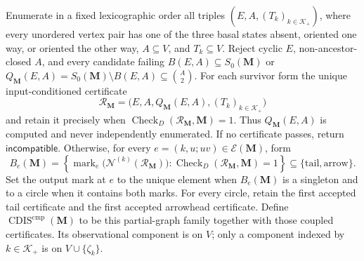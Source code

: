 Enumerate in a fixed lexicographic order all triples \((E,A,(T_k)_{k\in\mathcal K_+})\), where every unordered vertex pair has one of the three basal states absent, oriented one way, or oriented the other way, \(A\subseteq V\), and \(T_k\subseteq V\).  Reject cyclic \(E\), non-ancestor-closed \(A\), and every candidate failing \(B(E,A)\subseteq S_0(\mathbf M)\) or \(Q_{\mathbf M}(E,A)=S_0(\mathbf M)\setminus B(E,A)\subseteq\binom A2\).  For each survivor form the unique input-conditioned certificate
\[
\mathcal R_{\mathbf M}=\bigl(E,A,Q_{\mathbf M}(E,A),(T_k)_{k\in\mathcal K_+}\bigr)
\]
and retain it precisely when \(\operatorname{Check}_{D}(\mathcal R_{\mathbf M},\mathbf M)=1\).  Thus \(Q_{\mathbf M}(E,A)\) is computed and never independently enumerated.  If no certificate passes, return \(\mathsf{incompatible}\).  Otherwise, for every \(e=(k,u;uv)\in\mathcal E(\mathbf M)\), form
\[
B_e(\mathbf M)=\left\{\operatorname{mark}_e\bigl(\mathcal N^{(k)}(\mathcal R_{\mathbf M})\bigr):
\operatorname{Check}_{D}(\mathcal R_{\mathbf M},\mathbf M)=1\right\}
\subseteq\{\mathrm{tail},\mathrm{arrow}\}.
\]
Set the output mark at \(e\) to the unique element when \(B_e(\mathbf M)\) is a singleton and to a circle when it contains both marks.  For every circle, retain the first accepted tail certificate and the first accepted arrowhead certificate.  Define \(\operatorname{CDIS}^{\mathrm{cmp}}(\mathbf M)\) to be this partial-graph family together with those coupled certificates.  Its observational component is on \(V\); only a component indexed by \(k\in\mathcal K_+\) is on \(V\cup\{\zeta_k\}\).